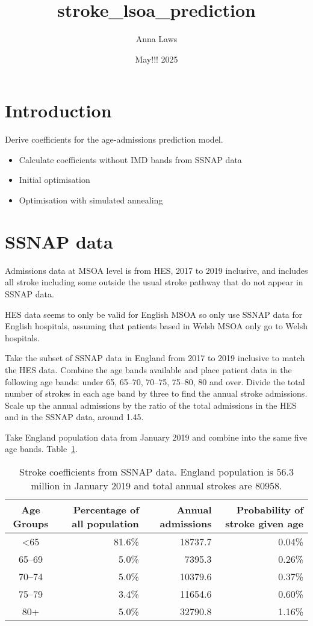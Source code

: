 \documentclass[12pt]{extarticle}
\title{stroke\_lsoa\_prediction}
\author{Anna Laws}
\date{May!!! 2025}
\begin{document}
\maketitle

\section{Introduction}

Derive coefficients for the age-admissions prediction model.

\begin{itemize}
    \item Calculate coefficients without IMD bands from SSNAP data
    \item Initial optimisation
    \item Optimisation with simulated annealing
\end{itemize}


\section{SSNAP data}

Admissions data at MSOA level is from HES, 2017 to 2019 inclusive, and includes all stroke including some outside the usual stroke pathway that do not appear in SSNAP data.

HES data seems to only be valid for English MSOA so only use SSNAP data for English hospitals, assuming that patients based in Welsh MSOA only go to Welsh hospitals.

Take the subset of SSNAP data in England from 2017 to 2019 inclusive to match the HES data. Combine the age bands available and place patient data in the following age bands: under 65, 65--70, 70--75, 75--80, 80 and over. Divide the total number of strokes in each age band by three to find the annual stroke admissions. Scale up the annual admissions by the ratio of the total admissions in the HES and in the SSNAP data, around 1.45.

Take England population data from January 2019 and combine into the same five age bands. Table~\ref{tab:ssnap_coeffs}.


\begin{table}
\centering
    \caption{Stroke coefficients from SSNAP data. England population is 56.3 million in January 2019 and total annual strokes are 80958.}
    \begin{tabular}{crrr}
    Age Groups & Percentage of all population & Annual admissions & Probability of stroke given age \\
    \hline
    <65 & 81.6\% & 18737.7 & 0.04\% \\
    65--69 & 5.0\% & 7395.3 & 0.26\% \\
    70--74 & 5.0\% & 10379.6 & 0.37\% \\
    75--79 & 3.4\% & 11654.6 & 0.60\% \\
    80+ & 5.0\% & 32790.8 & 1.16\% \\
    \end{tabular}
    \label{tab:ssnap_coeffs}
\end{table}
\end{document}
